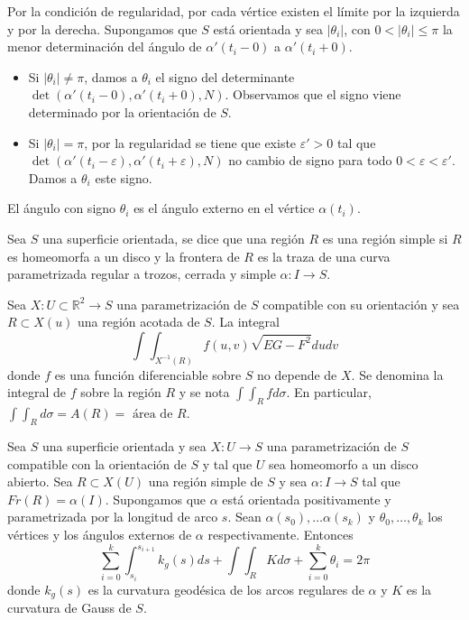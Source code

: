 \begin{definition}
    Por la condición de regularidad, por cada vértice existen el límite por la izquierda y por la derecha.
    Supongamos que $S$ está orientada y sea $|\theta_i|$, con $0 < |\theta_i| \leq \pi$ la menor determinación del ángulo de $\alpha'(t_i - 0)$ a $\alpha'(t_i + 0)$.
    \begin{itemize}
        \item Si $|\theta_i| \neq \pi$, damos a $\theta_i$ el signo del determinante $\det(\alpha'(t_i-0), \alpha'(t_i+0), N)$.
              Observamos que el signo viene determinado por la orientación de $S$.
        \item Si $|\theta_i| = \pi$, por la regularidad se tiene que existe $\varepsilon'>0$ tal que $\det(\alpha'(t_i-\varepsilon), \alpha'(t_i+\varepsilon), N)$ no cambio de signo para todo $0 < \varepsilon < \varepsilon'$.
              Damos a $\theta_i$ este signo.
    \end{itemize}
    El ángulo con signo $\theta_i$ es el ángulo externo en el vértice $\alpha(t_i)$.
\end{definition}

\begin{definition}
    Sea $S$ una superficie orientada, se dice que una región $R$ es una región simple si $R$ es homeomorfa a un disco y la frontera de $R$ es la traza de una curva parametrizada regular a trozos, cerrada y simple $\alpha: I \to S$.
\end{definition}

\begin{definition}
    Sea $X: U \subset \mathbb{R}^2 \to S$ una parametrización de $S$ compatible con su orientación y sea $R \subset X(u)$ una región acotada de $S$.
    La integral $$\int\int_{X^{-1}(R)} f(u, v) \sqrt{EG-F^2} dudv$$ donde $f$ es una función diferenciable sobre $S$ no depende de $X$.
    Se denomina la integral de $f$ sobre la región $R$ y se nota $\int\int_R f d\sigma$.
    En particular, $\int\int_R d\sigma = A(R) = \text{ área de } R$.
\end{definition}

\begin{theorem}
    Sea $S$ una superficie orientada y sea $X: U \to S$ una parametrización de $S$ compatible con la orientación de $S$ y tal que $U$ sea homeomorfo a un disco abierto.
    Sea $R \subset X(U)$ una región simple de $S$ y sea $\alpha: I \to S$ tal que $Fr(R) = \alpha(I)$.
    Supongamos que $\alpha$ está orientada positivamente y parametrizada por la longitud de arco $s$.
    Sean $\alpha(s_0), \dots \alpha(s_k)$ y $\theta_0, \dots, \theta_k$ los vértices y los ángulos externos de $\alpha$ respectivamente.
    Entonces
    $$\sum_{i=0}^k \int_{s_i}^{s_{i+1}} k_g(s) ds + \int\int_R K d\sigma + \sum_{i=0}^k \theta_i = 2\pi$$
    donde $k_g(s)$ es la curvatura geodésica de los arcos regulares de $\alpha$ y $K$ es la curvatura de Gauss de $S$.
\end{theorem}